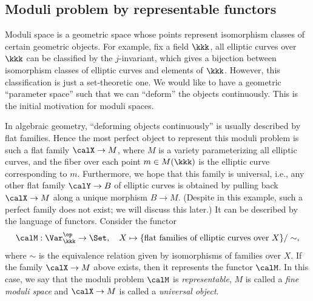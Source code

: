 \subsection{Moduli problem by representable functors}
    
    Moduli space is a geometric space whose points represent isomorphism classes of certain geometric objects.
    For example, fix a field \(\kkk\), all elliptic curves over \(\kkk\) can be classified by the \(j\)-invariant, which gives a bijection between isomorphism classes of elliptic curves and elements of \(\kkk\).
    However, this classification is just a set-theoretic one.
    We would like to have a geometric ``parameter space'' such that we can ``deform'' the objects continuously.
    This is the initial motivation for moduli spaces.

    In algebraic geometry, ``deforming objects continuously'' is usually described by flat families.
    Hence the most perfect object to represent this moduli problem is such a flat family \(\calX \to M\), where \(M\) is a variety parameterizing all elliptic curves, and the fiber over each point \(m \in M(\kkk)\) is the elliptic curve corresponding to \(m\).
    Furthermore, we hope that this family is universal, i.e., any other flat family \(\calY \to B\) of elliptic curves is obtained by pulling back \(\calX \to M\) along a unique morphism \(B \to M\).
    (Despite in this example, such a perfect family does not exist; we will discuss this later.)
    It can be described by the language of functors.
    Consider the functor
    \[ \calM: \Var_{\kkk}^{\op} \to \Set,\quad X \mapsto \{\text{flat families of elliptic curves over } X\}/\sim, \]
    where \(\sim\) is the equivalence relation given by isomorphisms of families over \(X\).
    If the family \(\calX \to M\) above exists, then it represents the functor \(\calM\).
    In this case, we say that the moduli problem \(\calM\) is \emph{representable}, \(M\) is called a \emph{fine moduli space} and \(\calX \to M\) is called a \emph{universal object}.


    

